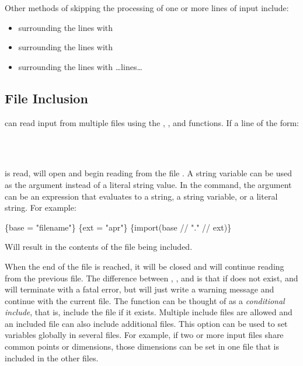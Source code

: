 Other methods of skipping the processing of one or more lines of input include:
\begin{itemize}
\item surrounding the lines with 
\item surrounding the lines with 
\item surrounding the lines with \ldots{}lines\ldots{}
\end{itemize}

\subsection{File Inclusion}\label{sec:inclusion} \aprepro{} can read input from multiple
files using the , , and  functions. If a line
of the form:

\\
\\

is read, \aprepro{} will open and begin reading from the file
.  A string variable can be used as the argument
instead of a literal string value.  In the  command, the
argument can be an expression that evaluates to a string, a string
variable, or a literal string. For example:
\begin{apinp}
\{base = "filename"\}
\{ext = "apr"\}
\{import(base // "." // ext)\}
\end{apinp}
Will result in the contents of the file  being included.

When the end of the file is reached, it will be closed and \aprepro{}
will continue reading from the previous file. The difference between
, , and  is that if  does
not exist,  and  will terminate \aprepro{} with a fatal
error, but  will just write a warning message and
continue with the current file. The  function can be
thought of as a {\em conditional include}, that is, include the file
if it exists. Multiple include files are allowed and an included file
can also include additional files. This option can be used to set
variables globally in several files. For example, if two or more input
files share common points or dimensions, those dimensions can be set
in one file that is included in the other files.


